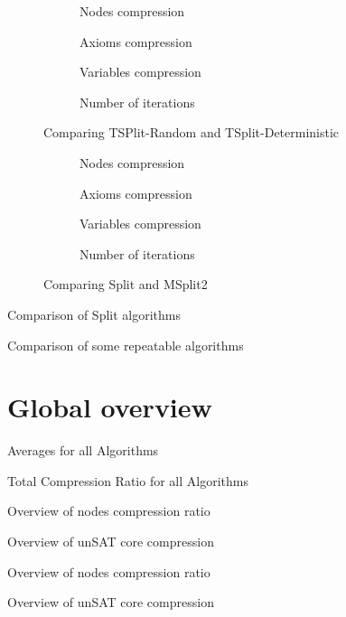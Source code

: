 \begin{figure}[hbt]
  \begin{subfigure}{0.5\textwidth}
    \centering
    \caption{Nodes compression}
  \end{subfigure}
  \begin{subfigure}{0.5\textwidth}
    \centering
    \caption{Axioms compression}
  \end{subfigure}
  \begin{subfigure}{0.5\textwidth}
    \centering
    \caption{Variables compression}
  \end{subfigure}
  \begin{subfigure}{0.5\textwidth}
    \centering
    \caption{Number of iterations}
  \end{subfigure}
  \caption{Comparing TSPlit-Random and TSplit-Deterministic}
\end{figure}
\begin{figure}[hbt]
  \begin{subfigure}{0.5\textwidth}
    \centering
    \caption{Nodes compression}
  \end{subfigure}
  \begin{subfigure}{0.5\textwidth}
    \centering
    \caption{Axioms compression}
  \end{subfigure}
  \begin{subfigure}{0.5\textwidth}
    \centering
    \caption{Variables compression}
  \end{subfigure}
  \begin{subfigure}{0.5\textwidth}
    \centering
    \caption{Number of iterations}
  \end{subfigure}
  \caption{Comparing Split and MSplit2}
\end{figure}
\begin{table}[hbt]
  \centering
  \caption{Comparison of Split algorithms}
\end{table}
\begin{table}[hbt]
  \centering
  \caption{Comparison of some repeatable algorithms}
\end{table}
\section{Global overview}
\begin{table}[hbt]
  \centering
  \caption{Averages for all Algorithms}
\end{table}
\begin{table}[hbt]
  \centering
  \caption{Total Compression Ratio for all Algorithms}
\end{table}
\begin{table}[hbt]
  \centering
  \caption{Overview of nodes compression ratio}
\end{table}
\begin{table}[hbt]
  \centering
  \caption{Overview of unSAT core compression}
\end{table}
\begin{table}[hbt]
  \centering
  \caption{Overview of nodes compression ratio}
\end{table}
\begin{table}[hbt]
  \centering
  \caption{Overview of unSAT core compression}
\end{table}
